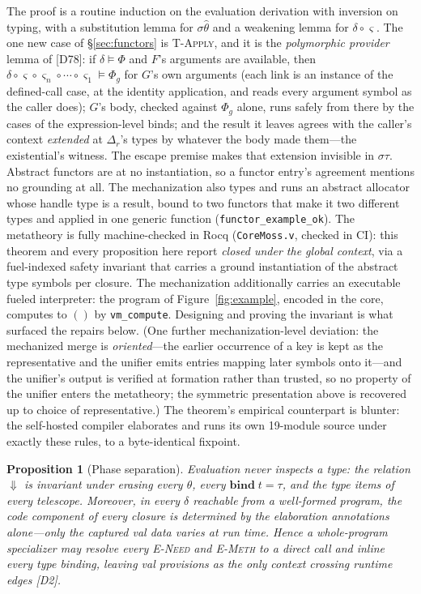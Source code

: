 \documentclass[10pt]{article}
\newcommand{\kw}[1]{\mathbf{#1}}          %
\newcommand{\thh}{\hat\theta}
\newcommand{\Eval}{\Downarrow}
\newcommand{\unitv}{()}
\theoremstyle{plain}
\newtheorem{proposition}[theorem]{Proposition}
\theoremstyle{remark}
\begin{document}
The proof is a routine induction on the evaluation derivation with
inversion on typing, with a substitution lemma for $\sigma\thh$ and a
weakening lemma for $\delta \circ \varsigma$. The one new case of
\S\ref{sec:functors} is \textsc{T-Apply}, and it is the \emph{polymorphic
provider} lemma of [D78]: if $\delta \models \Phi$ and $F$'s arguments
are available, then $\delta \circ \varsigma \circ \varsigma_n \circ \cdots
\circ \varsigma_1 \models \Phi_g$ for $G$'s own arguments (each link is an
instance of the defined-call case, at the identity application, and reads
every argument symbol as the caller does); $G$'s body, checked against
$\Phi_g$ alone, runs safely from there by the cases of the expression-level
binds; and the result it leaves agrees with the caller's context
\emph{extended} at $\Delta_r$'s types by whatever the body made them---the
existential's witness. The escape premise makes that extension invisible
in $\sigma\tau$. Abstract functors are at no instantiation, so a functor
entry's agreement mentions no grounding at all. The mechanization also
types and runs an abstract allocator whose handle type is a result,
bound to two functors that make it two different types and applied in
one generic function (\texttt{functor\_example\_ok}). The metatheory is fully
machine-checked in Rocq (\texttt{CoreMoss.v}, checked in CI): this
theorem and every proposition here report \emph{closed under the global
context}, via a fuel-indexed safety invariant that carries a ground
instantiation of the abstract type symbols per closure.  The
mechanization additionally carries an executable fueled interpreter:
the program of Figure~\ref{fig:example}, encoded in the core, computes
to $\unitv$ by \texttt{vm\_compute}.  Designing and proving the
invariant is what surfaced the repairs below. (One further
mechanization-level deviation: the mechanized merge is \emph{oriented}---the
earlier occurrence of a key is kept as the representative and the unifier
emits entries mapping later symbols onto it---and the unifier's output is
verified at formation rather than trusted, so no property of the unifier
enters the metatheory; the symmetric presentation above is recovered up to
choice of representative.) The theorem's empirical
counterpart is blunter: the self-hosted compiler elaborates and runs
its own 19-module source under exactly these rules, to a byte-identical
fixpoint.

\begin{proposition}[Phase separation]\label{prop:phase}
Evaluation never inspects a type: the relation $\Eval$ is invariant
under erasing every $\theta$, every $\kw{bind}\;t = \tau$, and the type
items of every telescope. Moreover, in every $\delta$ reachable from a
well-formed program, the code component of every closure is determined
by the elaboration annotations alone---only the captured val data varies
at run time. Hence a whole-program specializer may resolve every
\textsc{E-Need} and \textsc{E-Meth} to a direct call and inline every
type binding, leaving val provisions as the only context crossing
runtime edges [D2].
\end{proposition}
\end{document}
